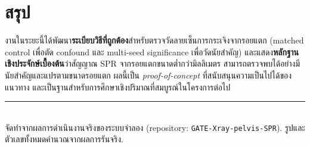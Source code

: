 \documentclass[14pt]{extarticle}
\begin{document}
\section{สรุป}
งานในระยะนี้ได้พัฒนา\textbf{ระเบียบวิธีที่ถูกต้อง}สำหรับตรวจวัดลายเซ็นการกระเจิงจากรอยแตก
(matched control เพื่อตัด confound และ multi-seed significance เพื่อวัดนัยสำคัญ)
และแสดง\textbf{หลักฐานเชิงประจักษ์เบื้องต้น}ว่าสัญญาณ SPR จากรอยแตกขนาดต่ำกว่ามิลลิเมตร
สามารถตรวจพบได้อย่างมีนัยสำคัญและแปรตามขนาดรอยแตก ผลนี้เป็น \textit{proof-of-concept}
ที่สนับสนุนความเป็นไปได้ของแนวทาง และเป็นฐานสำหรับการศึกษาเชิงปริมาณที่สมบูรณ์ในโครงการต่อไป

\vfill
\noindent\rule{\textwidth}{0.4pt}\\
{\small\color{ink} จัดทำจากผลการดำเนินงานจริงของระบบจำลอง (repository: \texttt{GATE-Xray-pelvis-SPR}).
รูปและตัวเลขทั้งหมดคำนวณจากผลการรันจริง.}
\end{document}
